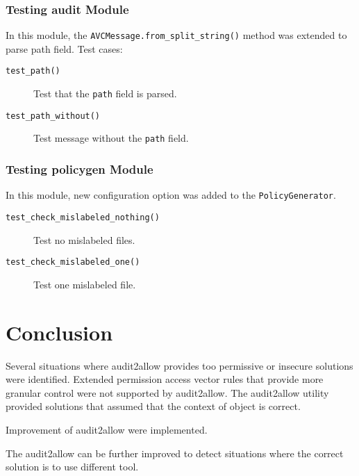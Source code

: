 \subsection{Testing audit Module}
In this module, the \texttt{AVCMessage.from\_split\_string()} method was
extended to parse path field. Test cases:
\begin{description}
    \item [\texttt{test\_path()}] Test that the \texttt{path} field is parsed.
    \item [\texttt{test\_path\_without()}] Test message without the \texttt{path}
        field.
\end{description}

\subsection{Testing policygen Module}
In this module, new configuration option was added to the
\texttt{PolicyGenerator}.
\begin{description}
    \item [\texttt{test\_check\_mislabeled\_nothing()}] Test no mislabeled
        files.
    \item [\texttt{test\_check\_mislabeled\_one()}] Test one mislabeled file.
\end{description}

\chapter{Conclusion}


Several situations where audit2allow provides too permissive or insecure
solutions were identified. Extended permission access vector rules that provide
more granular control were not supported by audit2allow. The audit2allow utility
provided solutions that assumed that the context of object is correct.

Improvement of audit2allow were implemented.

The audit2allow can be further improved to detect situations where the correct
solution is to use different tool.
